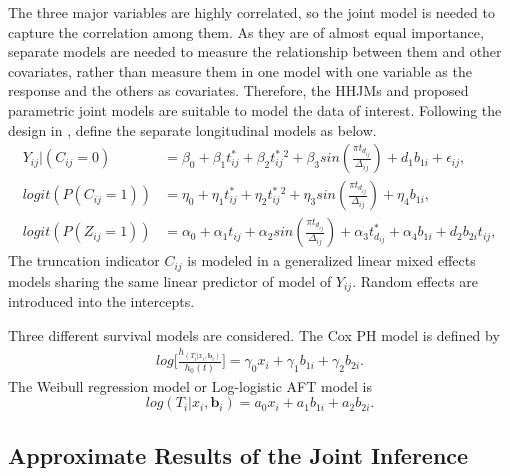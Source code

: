 The three major variables are highly correlated, so the joint model is needed to capture the correlation among them. As they are of almost equal importance, separate models are needed to measure the relationship between them and other covariates, rather than measure them in one model with one variable as the response and the others as covariates. Therefore, the HHJMs and proposed parametric joint models are suitable to model the data of interest.
Following the design in \cite{yu2018joint}, define the separate longitudinal models as below. 
\begin{equation}
    \begin{split}
        Y_{ij}|(C_{ij} = 0) &=  \beta_0 + \beta_1 t_{ij}^{\ast} + \beta_2  t_{ij}^{\ast}^2 + \beta_3 sin(\frac{\pi t_{d_{ij}}}{\Delta_{ij}}) + d_1 b_{1i} + \epsilon_{ij}, \\
                logit(P(C_{ij} = 1)) &=  \eta_0 + \eta_1 t_{ij}^{\ast} + \eta_2  t_{ij}^{\ast}^2 + \eta_3 sin(\frac{\pi t_{d_{ij}}}{\Delta_{ij}}) + \eta_4 b_{1i},  \\
               logit(P(Z_{ij} = 1)) &= \alpha_0 + \alpha_1 t_{ij} + \alpha_2 sin(\frac{\pi t_{d_{ij}}}{\Delta_{ij}}) + \alpha_3 t_{d_{ij}}^{\ast} + \alpha_4 b_{1i} + d_2 b_{2i} t_{ij},
    \end{split}
    \label{eq:y}
\end{equation}
The truncation indicator $C_{ij}$ is modeled in a generalized linear mixed effects models sharing the same linear predictor of model of $Y_{ij}$. Random effects are introduced into the intercepts.

Three different survival models are considered. The Cox PH model is defined by
\begin{equation}
    \begin{split}
        log\Big[ \frac{h_(T_i|x_i,\boldsymbol{b}_i)}{h_0(t)}\Big] = \gamma_0 x_i + \gamma_1 b_{1i} + \gamma_2 b_{2i}.
    \end{split}
\end{equation}
The Weibull regression model or Log-logistic AFT model is
\begin{equation}
    log(T_i|x_i,\boldsymbol{b}_i) = a_0 x_i + a_1 b_{1i} + a_2 b_{2i}.
\end{equation}


\subsection{Approximate Results of the Joint Inference}

